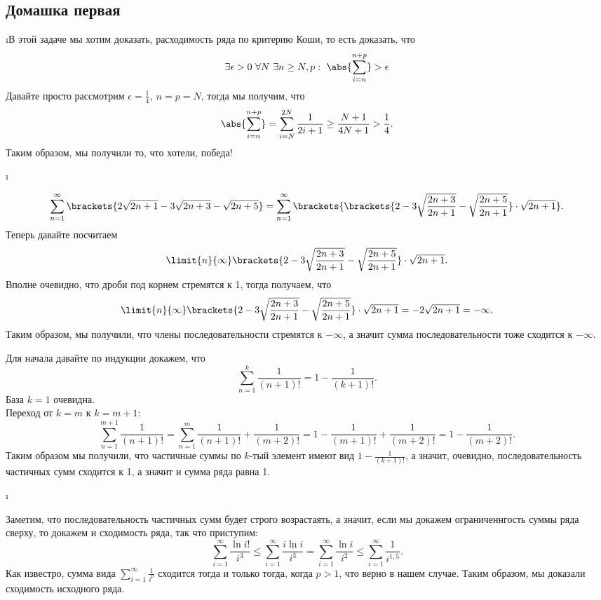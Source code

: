 \subsection{Домашка первая}

\i В этой задаче мы хотим доказать, расходимость ряда по критерию Коши, то есть доказать, что 
    \[\exists \epsilon > 0\ \forall N \ \exists n \geq N, p: \ \abs{\sum_{i=n}^{n+p}} > \epsilon\]
Давайте просто рассмотрим $\epsilon = \frac{1}{4},\ n = p = N$, тогда мы получим, что 
    \[\abs{\sum_{i=n}^{n+p}} = \sum_{i = N}^{2N} \frac{1}{2i + 1} \geq \frac{N+1}{4N + 1} > \frac{1}{4}.\]
Таким образом, мы получили то, что хотели, победа!

\i 

\pu
\begin{gather*}
    \sum_{n=1}^{\infty}\brackets{2\sqrt{2n+1} - 3\sqrt{2n+3} - \sqrt{2n+5}} = 
    \sum_{n=1}^{\infty}\brackets{\brackets{2 - 3\sqrt{\frac{2n+3}{2n+1}} - \sqrt{\frac{2n+5}{2n+1}}} \cdot \sqrt{2n+1}}.
\end{gather*}
Теперь давайте посчитаем 
    \[\limit{n}{\infty} \brackets{2 - 3\sqrt{\frac{2n+3}{2n+1}} - \sqrt{\frac{2n+5}{2n+1}}} \cdot \sqrt{2n+1}.\]
Вполне очевидно, что дроби под корнем стремятся к 1, тогда получаем, что 
    \[\limit{n}{\infty} \brackets{2 - 3\sqrt{\frac{2n+3}{2n+1}} - \sqrt{\frac{2n+5}{2n+1}}} \cdot \sqrt{2n+1} = -2\sqrt{2n+1} = -\infty.\]
Таким образом, мы получили, что члены последовательности стремятся к $-\infty$, а значит сумма последовательности тоже сходится к $-\infty$.

\pu Для начала давайте по индукции докажем, что 
    \[\sum_{n = 1}^k \frac{1}{(n+1)!} = 1 - \frac{1}{(k+1)!}.\]
База $k = 1$ очевидна.\\ 
Переход от $k = m$ к $k = m+1$:
    \[\sum_{n = 1}^{m+1} \frac{1}{(n+1)!} = \sum_{n = 1}^m \frac{1}{(n+1)!} + \frac{1}{(m+2)!} = 1 - \frac{1}{(m+1)!} + \frac{1}{(m+2)!} = 1 - \frac{1}{(m+2)!}.\]
Таким образом мы получили, что частичные суммы по $k$-тый элемент имеют вид $1 - \frac{1}{(k+1)!}$, а значит, очевидно, последовательность частичных сумм сходится
к 1, а значит и сумма ряда равна 1.


\i 

\pu Заметим, что последовательность частичных сумм будет строго возрастаять, а значит, если мы докажем ограниченнгость суммы ряда сверху, то докажем и сходимость 
ряда, так что приступим:
    \[\sum_{i=1}^{\infty} \frac{\ln{i!}}{i^3} \leq \sum_{i=1}^{\infty} \frac{i\ln{i}}{i^3} = \sum_{i=1}^{\infty} \frac{\ln{i}}{i^2} \leq 
    \sum_{i=1}^{\infty}\frac{1}{i^{1{,}5}}.\]
Как известро, сумма вида $\sum_{i=1}^{\infty} \frac{1}{i^p}$ сходится тогда и только тогда, когда $p > 1$, что верно в нашем случае. Таким образом, мы доказали
сходимость исходного ряда.

